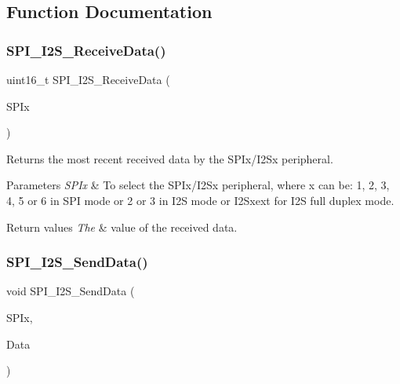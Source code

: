 \subsection{Function Documentation}
\mbox{\label{group___s_p_i___group2_gab77de76547f3bff403236b263b070a30}} 
\subsubsection{\texorpdfstring{S\+P\+I\+\_\+\+I2\+S\+\_\+\+Receive\+Data()}{SPI\_I2S\_ReceiveData()}}
{\footnotesize\ttfamily uint16\+\_\+t S\+P\+I\+\_\+\+I2\+S\+\_\+\+Receive\+Data (\begin{DoxyParamCaption}\item[{S\+P\+I\+\_\+\+Type\+Def $\ast$}]{S\+P\+Ix }\end{DoxyParamCaption})}



Returns the most recent received data by the S\+P\+Ix/\+I2\+Sx peripheral. 


\begin{DoxyParams}{Parameters}
{\em S\+P\+Ix} & To select the S\+P\+Ix/\+I2\+Sx peripheral, where x can be\+: 1, 2, 3, 4, 5 or 6 in S\+PI mode or 2 or 3 in I2S mode or I2\+Sxext for I2S full duplex mode. \\
\hline
\end{DoxyParams}

\begin{DoxyRetVals}{Return values}
{\em The} & value of the received data. \\
\hline
\end{DoxyRetVals}
\mbox{\label{group___s_p_i___group2_gad5af40bebe8dbe3fa8bd476489d7e3da}} 
\subsubsection{\texorpdfstring{S\+P\+I\+\_\+\+I2\+S\+\_\+\+Send\+Data()}{SPI\_I2S\_SendData()}}
{\footnotesize\ttfamily void S\+P\+I\+\_\+\+I2\+S\+\_\+\+Send\+Data (\begin{DoxyParamCaption}\item[{S\+P\+I\+\_\+\+Type\+Def $\ast$}]{S\+P\+Ix,  }\item[{uint16\+\_\+t}]{Data }\end{DoxyParamCaption})}



